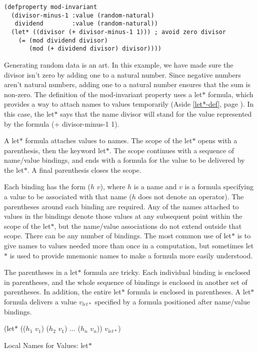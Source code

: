 \begin{Verbatim}
(defproperty mod-invariant
  (divisor-minus-1 :value (random-natural)
   dividend        :value (random-natural))
  (let* ((divisor (+ divisor-minus-1 1))) ; avoid zero divisor
    (= (mod dividend divisor)
       (mod (+ dividend divisor) divisor))))
\end{Verbatim}

Generating
random data
is an art.
In this example, we have made sure the divisor isn't zero
by adding one to a natural number.
Since negative numbers aren't natural numbers, adding one
to a natural number ensures that the sum is non-zero.
\label{let-example-brief-explain}
The definition of the \textsf{mod-invariant} property 
uses a \textsf{let$*$} formula,
which provides a way to attach names to values temporarily
(Aside \ref{let*-def}, page \pageref{let*-def}).
In this case, the \textsf{let$*$} says that
the name \textsf{divisor} will stand for
the value represented by the formula \textsf{(+ divisor-minus-1 1)}.

\begin{aside}
A 
\textsf{let$*$}
formula attaches values to names.
The scope of the \textsf{let$*$} opens with a parenthesis,
then the keyword \textsf{let$*$}. 
The scope continues with
a sequence of name/value bindings, 
and ends with a formula for the value 
to be delivered by the \textsf{let$*$}.
A final parenthesis closes the scope.

Each binding has the form ($h$ $v$),
where $h$ is a name and $v$ is a
formula specifying a value to be associated with that name
($h$ does not denote an operator).
The parentheses around each binding are required.
Any of the names attached to values in the bindings
denote those values at any
subsequent point within the scope 
of the \textsf{let$*$},
but the name/value associations do not
extend outside that scope.
There can be any number of bindings.
The most common use of \textsf{let$*$} is to give names
to values needed more than once in a computation,
but sometimes \textsf{let$*$} is used to provide mnemonic names
to make a formula more easily understood.

The parentheses in a \textsf{let$*$} formula are tricky.
Each individual binding is enclosed in parentheses,
and the whole sequence of bindings is enclosed in another set
of parentheses. In addition, the entire \textsf{let$*$} formula
is enclosed in parentheses.
A \textsf{let$*$} formula delivers a value $v_{let*}$
specified by a formula positioned after name/value bindings.
\begin{center}
(let$*$ (($h_1$ $v_1$) ($h_2$ $v_1$) $\dots$ ($h_n$ $v_n$)) $v_{let*}$)
\end{center}
\caption{Local Names for Values: \textsf{let$*$}}
\label{let*-def}
\end{aside}

